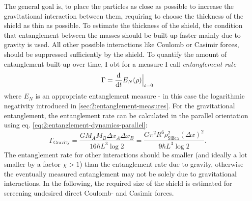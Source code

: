 The general goal is, to place the particles as close as possible to increase the gravitational interaction between them, requiring to choose the thickness of the shield as thin as possible.
To estimate the thickness of the shield, the condition that entanglement between the masses should be built up faster mainly due to gravity is used.
All other possible interactions like Coulomb or Casimir forces, should be suppressed sufficiently by the shield.
To quantify the amount of entanglement built-up over time, I obt for a measure I call \emph{entanglement rate}
\begin{equation}\label{eq:5:entanglement-rate}
  \Gamma = \dv{t} E_N(\rho)\Big|_{t=0}
\end{equation} 
where $E_N$ is an appropriate entanglement measure - in this case the logarithmic negativity \cite{Plenio_2005} introduced in \cref{sec:2:entanglement-measures}.
For the gravitational entanglement, the entanglement rate can be calculated in the parallel orientation using eq. \eqref{eq:2:entanglement-dynamics-parallel}:
\begin{equation}\label{eq:5:entanglement-rate-gravity}
  \Gamma_\mathrm{Gravity} = \frac{G M_A M_B \Delta x_A \Delta x_B}{16 \hbar L^3 \log 2} = \frac{G \pi^2 R^6 \rho_\mathrm{Silica}^2 (\Delta x)^2}{9 \hbar L^3 \log 2} .
\end{equation}
The entanglement rate for other interactions should be smaller (and ideally a lot smaller by a factor $\chi > 1$) than the entanglement rate due to gravity, otherwise the eventually measured entanglement may not be solely due to gravitational interactions.
In the following, the required size of the shield is estimated for screening undesired direct Coulomb- and Casimir forces.

